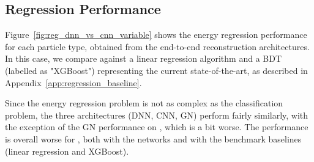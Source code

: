 \begin{figure*}[htbp]
\centering
\caption{Classification accuracy of best performing network for $\gamma$ vs. $\pi^0$ (top) and $e$ vs. $\pi^\pm$ (bottom), in bins of energy (left) and $\eta$ (right).}
\label{fig:accuracy_bins}
\end{figure*}


\subsection{Regression Performance}
\label{sec:regression}

Figure~\ref{fig:reg_dnn_vs_cnn_variable} shows the energy regression performance for each particle type, obtained from the end-to-end reconstruction architectures. In this case, we compare against a linear regression algorithm and a BDT (labelled as "XGBoost") representing the current state-of-the-art, as described in Appendix~\ref{app:regression_baseline}. 

\begin{figure*}[htbp]
\centering
\caption{Regression bias (top) and resolution (bottom) as a function
  of true energy for energy predictions on the REC dataset with
  variable-angle incident angle. From top to bottom: electrons,
  charged pions, photons, and neutral
  pions.\label{fig:reg_dnn_vs_cnn_variable}}
\end{figure*}

Since the energy regression problem is not as complex as the classification problem, the three architectures (DNN, CNN, GN) perform fairly similarly, with the exception of the GN performance on \chpi, which is a bit worse.
The performance is overall worse for \chpi, both with the networks and with the benchmark baselines (linear regression and XGBoost).

